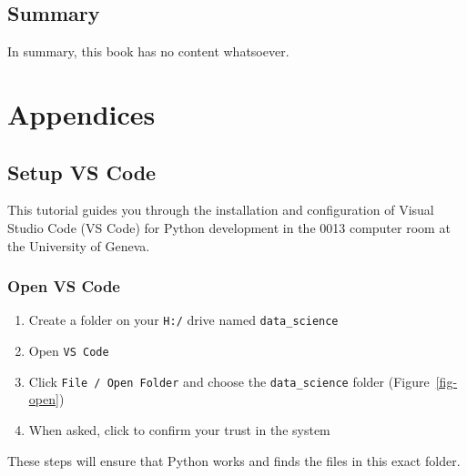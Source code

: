 \documentclass[
  letterpaper,
  DIV=11,
  numbers=noendperiod]{scrreprt}
\providecommand{\tightlist}{%
  \setlength{\itemsep}{0pt}\setlength{\parskip}{0pt}}\usepackage{longtable,booktabs,array}
\begin{document}
\chapter{Summary}\label{summary}

In summary, this book has no content whatsoever.

\part{Appendices}

\chapter*{Setup VS Code}\label{setup-vs-code}


This tutorial guides you through the installation and configuration of
Visual Studio Code (VS Code) for Python development in the 0013 computer
room at the University of Geneva.

\section*{Open VS Code}\label{open-vs-code}


\begin{enumerate}
\def\labelenumi{\arabic{enumi}.}
\tightlist
\item
  Create a folder on your \texttt{H:/} drive named
  \texttt{data\_science}
\item
  Open \texttt{VS\ Code}
\item
  Click \texttt{File\ /\ Open\ Folder} and choose the
  \texttt{data\_science} folder (Figure~\ref{fig-open})
\item
  When asked, click to confirm your trust in the system
\end{enumerate}

These steps will ensure that Python works and finds the files in this
exact folder.
\end{document}

